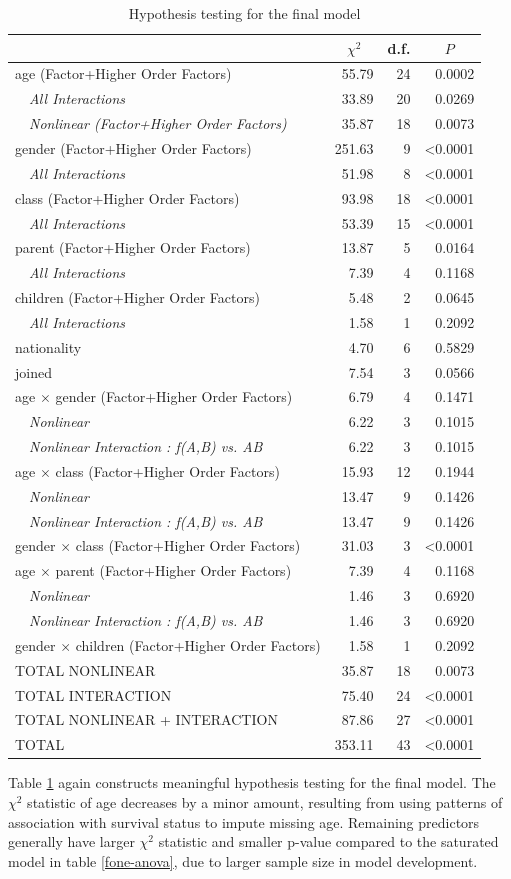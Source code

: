 \documentclass[]{interact}
\theoremstyle{plain}%
\theoremstyle{definition}
\theoremstyle{remark}
\begin{document}
\begin{table}[h]
{\small
\caption{Hypothesis testing for the final model\label{ftwo-anova}} 
\begin{center}
\begin{tabular}{lrrr}
\hline\hline
\multicolumn{1}{l}{}&\multicolumn{1}{c}{$\chi^{2}$}&\multicolumn{1}{c}{d.f.}&\multicolumn{1}{c}{$P$}\tabularnewline
\hline
age  (Factor+Higher Order Factors)& 55.79&24&0.0002\tabularnewline
~~\emph{All Interactions}& 33.89&20&0.0269\tabularnewline
~~\emph{Nonlinear (Factor+Higher Order Factors)}& 35.87&18&0.0073\tabularnewline
gender  (Factor+Higher Order Factors)&251.63& 9&\textless 0.0001\tabularnewline
~~\emph{All Interactions}& 51.98& 8&\textless 0.0001\tabularnewline
class  (Factor+Higher Order Factors)& 93.98&18&\textless 0.0001\tabularnewline
~~\emph{All Interactions}& 53.39&15&\textless 0.0001\tabularnewline
parent  (Factor+Higher Order Factors)& 13.87& 5&0.0164\tabularnewline
~~\emph{All Interactions}&  7.39& 4&0.1168\tabularnewline
children  (Factor+Higher Order Factors)&  5.48& 2&0.0645\tabularnewline
~~\emph{All Interactions}&  1.58& 1&0.2092\tabularnewline
nationality&  4.70& 6&0.5829\tabularnewline
joined&  7.54& 3&0.0566\tabularnewline
age $\times$ gender  (Factor+Higher Order Factors)&  6.79& 4&0.1471\tabularnewline
~~\emph{Nonlinear}&  6.22& 3&0.1015\tabularnewline
~~\emph{Nonlinear Interaction : f(A,B) vs. AB}&  6.22& 3&0.1015\tabularnewline
age $\times$ class  (Factor+Higher Order Factors)& 15.93&12&0.1944\tabularnewline
~~\emph{Nonlinear}& 13.47& 9&0.1426\tabularnewline
~~\emph{Nonlinear Interaction : f(A,B) vs. AB}& 13.47& 9&0.1426\tabularnewline
gender $\times$ class  (Factor+Higher Order Factors)& 31.03& 3&\textless 0.0001\tabularnewline
age $\times$ parent  (Factor+Higher Order Factors)&  7.39& 4&0.1168\tabularnewline
~~\emph{Nonlinear}&  1.46& 3&0.6920\tabularnewline
~~\emph{Nonlinear Interaction : f(A,B) vs. AB}&  1.46& 3&0.6920\tabularnewline
gender $\times$ children  (Factor+Higher Order Factors)&  1.58& 1&0.2092\tabularnewline
TOTAL NONLINEAR& 35.87&18&0.0073\tabularnewline
TOTAL INTERACTION& 75.40&24&\textless 0.0001\tabularnewline
TOTAL NONLINEAR + INTERACTION& 87.86&27&\textless 0.0001\tabularnewline
TOTAL&353.11&43&\textless 0.0001\tabularnewline
\hline
\end{tabular}\end{center}}
\end{table}

Table \ref{ftwo-anova} again constructs meaningful hypothesis testing for the final model. The \(\chi^2\) statistic of age decreases by a minor amount, resulting from using patterns of association with survival status to impute missing age. Remaining predictors generally have larger \(\chi^2\) statistic and smaller p-value compared to the saturated model in table \ref{fone-anova}, due to larger sample size in model development.
\end{document}
